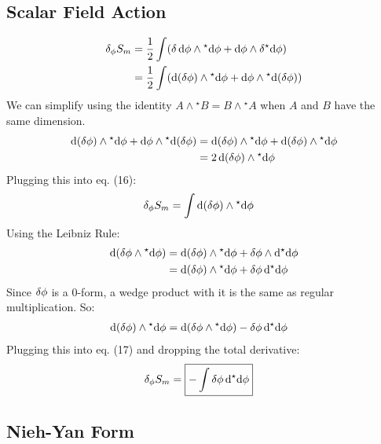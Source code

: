 \documentclass[12pt]{article}
\newcommand{\hodge}{{^\star}}
\begin{document}
\subsection{Scalar Field Action}
\begin{align}
  \var_\phi{S_m} &= \frac{1}{2} \int (\var{\dd{\phi}} \wedge \hodge{\dd{\phi}} + \dd{\phi} \wedge \var{\hodge{\dd{\phi}}}) \nonumber \\
  &= \frac{1}{2} \int (\dd(\var{\phi}) \wedge \hodge{\dd{\phi}} + \dd{\phi} \wedge \hodge{\dd(\var{\phi})})
\end{align}
We can simplify using the identity $A \wedge \hodge B = B \wedge \hodge A$ when $A$ and $B$ have the same dimension.
\begin{align*}
  \dd(\var{\phi}) \wedge \hodge{\dd{\phi}} + \dd{\phi} \wedge \hodge{\dd(\var{\phi})} &= \dd(\var{\phi}) \wedge \hodge{\dd{\phi}} + \dd(\var{\phi}) \wedge \hodge{\dd{\phi}} \\
  &= 2\dd(\var{\phi}) \wedge \hodge{\dd{\phi}}
\end{align*}
Plugging this into eq. (16):
\begin{align}
  \var_\phi{S_m} &= \int \dd(\var{\phi}) \wedge \hodge{\dd{\phi}}
\end{align}
Using the Leibniz Rule:
\begin{align*}
  \dd(\var{\phi} \wedge \hodge{\dd{\phi}}) &= \dd(\var{\phi}) \wedge \hodge{\dd{\phi}} + \var{\phi} \wedge \dd{\hodge{\dd{\phi}}} \\
  &= \dd(\var{\phi}) \wedge \hodge{\dd{\phi}} + \var{\phi}\dd{\hodge{\dd{\phi}}}
\end{align*}
Since $\var{\phi}$ is a 0-form, a wedge product with it is the same as regular multiplication. So:
\begin{align*}
  \dd(\var{\phi}) \wedge \hodge{\dd{\phi}} &= \dd(\var{\phi} \wedge \hodge{\dd{\phi}}) - \var{\phi}\dd{\hodge{\dd{\phi}}}
\end{align*}
Plugging this into eq. (17) and dropping the total derivative:
\begin{align}
  \var_\phi{S_m} &= \boxed{- \int \var{\phi}\dd{\hodge{\dd{\phi}}}}
\end{align}

\subsection{Nieh-Yan Form}
\end{document}
